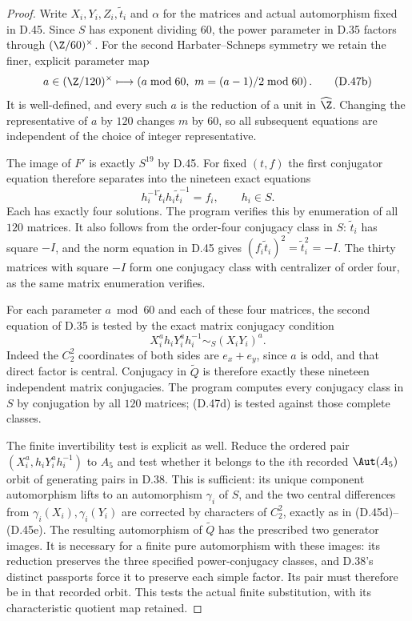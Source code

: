 \begin{proof}
Write $X_i,Y_i,Z_i,\widetilde t_i$ and $\alpha$ for
the matrices and actual automorphism fixed in D.45.
Since $S$ has exponent dividing $60$, the power
parameter in D.35 factors through
$(\Z/60)^\times$.  For the second Harbater--Schneps
symmetry we retain the finer, explicit parameter map
\[
 a\in(\Z/120)^\times\longmapsto
       \left(a\bmod60,\ m=(a-1)/2\bmod60\right).
                                                        \tag{D.47b}
\]
It is well-defined, and every such $a$ is the
reduction of a unit in $\widehat\Z$.
Changing the representative of $a$ by $120$ changes
$m$ by $60$, so all subsequent equations are
independent of the choice of integer representative.

The image of $F'$ is exactly $S^{19}$ by D.45.
For fixed $(t,f)$ the first conjugator equation
therefore separates into the nineteen exact equations
\[
 h_i^{-1}\widetilde t_i h_i\widetilde t_i^{-1}=f_i,
                                  \qquad h_i\in S.       \tag{D.47c}
\]
Each has exactly four solutions.  The program
verifies this by enumeration of all $120$ matrices.
It also follows from the order-four conjugacy class
in $S$: $\widetilde t_i$ has square $-I$, and the
norm equation in D.45 gives
$(f_i\widetilde t_i)^2=\widetilde t_i^2=-I$.
The thirty matrices with square $-I$ form one
conjugacy class with centralizer of order four,
as the same matrix enumeration verifies.

For each parameter $a\bmod60$ and each of these
four matrices, the second equation of D.35 is
tested by the exact matrix conjugacy condition
\[
      X_i^a h_iY_i^a h_i^{-1}
                       \sim_S (X_iY_i)^a.               \tag{D.47d}
\]
Indeed the $C_2^2$ coordinates of both sides are
$e_x+e_y$, since $a$ is odd, and that direct factor
is central.  Conjugacy in $\widetilde Q$ is therefore
exactly these nineteen independent matrix conjugacies.
The program computes every conjugacy class in $S$
by conjugation by all $120$ matrices; (D.47d) is
tested against those complete classes.

The finite invertibility test is explicit as well.
Reduce the ordered pair
$(X_i^a,h_iY_i^a h_i^{-1})$ to $A_5$ and test whether
it belongs to the $i$th recorded $\Aut(A_5)$ orbit
of generating pairs in D.38.
This is sufficient: its unique component
automorphism lifts to an automorphism $\gamma_i$
of $S$, and the two central differences from
$\gamma_i(X_i),\gamma_i(Y_i)$ are corrected by
characters of $C_2^2$, exactly as in (D.45d)--(D.45e).
The resulting automorphism of $\widetilde Q$ has
the prescribed two generator images.
It is necessary for a finite pure automorphism
with these images: its reduction preserves the
three specified power-conjugacy classes, and
D.38's distinct passports force it to preserve
each simple factor.  Its pair must therefore be
in that recorded orbit.  This tests the actual
finite substitution, with its characteristic
quotient map retained.


\end{proof}
